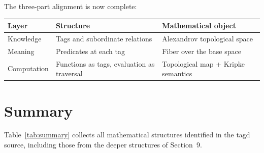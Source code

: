 \documentclass{article}
\begin{document}
The three-part alignment is now complete:

\begin{center}
\begin{tabular}{lll}
\toprule
\textbf{Layer} & \textbf{Structure} & \textbf{Mathematical object} \\
\midrule
Knowledge    & Tags and subordinate relations          & Alexandrov topological space \\
Meaning      & Predicates at each tag                 & Fiber over the base space \\
Computation  & Functions as tags, evaluation as traversal & Topological map + Kripke semantics \\
\bottomrule
\end{tabular}
\end{center}

\section{Summary}

Table~\ref{tab:summary} collects all mathematical structures identified in the
tagd source, including those from the deeper structures of Section~9.
\end{document}
